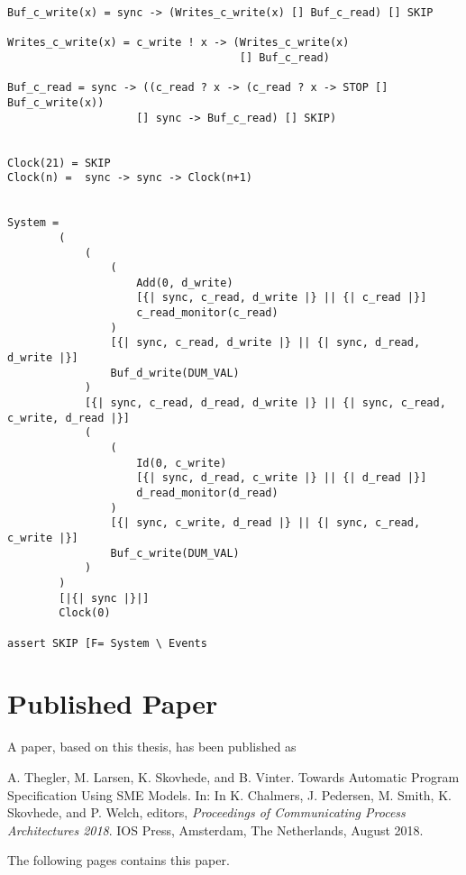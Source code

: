 \begin{verbatim}
Buf_c_write(x) = sync -> (Writes_c_write(x) [] Buf_c_read) [] SKIP

Writes_c_write(x) = c_write ! x -> (Writes_c_write(x)
                                    [] Buf_c_read)

Buf_c_read = sync -> ((c_read ? x -> (c_read ? x -> STOP [] Buf_c_write(x))
                    [] sync -> Buf_c_read) [] SKIP)


Clock(21) = SKIP
Clock(n) =  sync -> sync -> Clock(n+1)


System =
        (
            (
                (
                    Add(0, d_write)
                    [{| sync, c_read, d_write |} || {| c_read |}]
                    c_read_monitor(c_read)
                )
                [{| sync, c_read, d_write |} || {| sync, d_read, d_write |}]
                Buf_d_write(DUM_VAL)
            )
            [{| sync, c_read, d_read, d_write |} || {| sync, c_read, c_write, d_read |}]
            (
                (
                    Id(0, c_write)
                    [{| sync, d_read, c_write |} || {| d_read |}]
                    d_read_monitor(d_read)
                )
                [{| sync, c_write, d_read |} || {| sync, c_read, c_write |}]
                Buf_c_write(DUM_VAL)
            )
        )
        [|{| sync |}|]
        Clock(0)

assert SKIP [F= System \ Events
\end{verbatim}


\chapter{Published Paper}
\label{app:paper}
\noindent A paper, based on this thesis, has been published as

\begin{center}
\begin{minipage}{0.8\textwidth}
    A. Thegler, M. Larsen, K. Skovhede, and B. Vinter. Towards Automatic Program Specification Using SME Models. In: In K. Chalmers, J. Pedersen, M. Smith, K. Skovhede, and P. Welch,
    editors, {\itshape Proceedings of Communicating Process Architectures
    2018}. IOS Press, Amsterdam, The Netherlands,
    August 2018.
\end{minipage}
\end{center}
The following pages contains this paper.
